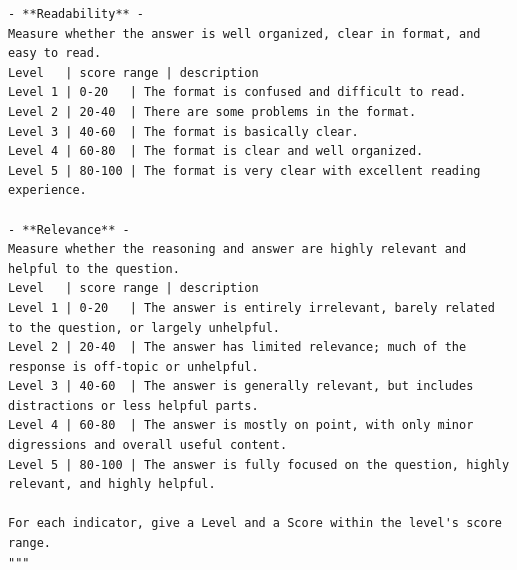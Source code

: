 \documentclass[a4paper,fleqn]{cas-dc}
\begin{document}
\begin{lstlisting}
- **Readability** -
Measure whether the answer is well organized, clear in format, and easy to read.
Level   | score range | description
Level 1 | 0-20   | The format is confused and difficult to read.
Level 2 | 20-40  | There are some problems in the format.
Level 3 | 40-60  | The format is basically clear.
Level 4 | 60-80  | The format is clear and well organized.
Level 5 | 80-100 | The format is very clear with excellent reading experience.

- **Relevance** -
Measure whether the reasoning and answer are highly relevant and helpful to the question.
Level   | score range | description
Level 1 | 0-20   | The answer is entirely irrelevant, barely related to the question, or largely unhelpful.
Level 2 | 20-40  | The answer has limited relevance; much of the response is off-topic or unhelpful.
Level 3 | 40-60  | The answer is generally relevant, but includes distractions or less helpful parts.
Level 4 | 60-80  | The answer is mostly on point, with only minor digressions and overall useful content.
Level 5 | 80-100 | The answer is fully focused on the question, highly relevant, and highly helpful.

For each indicator, give a Level and a Score within the level's score range.
"""
\end{lstlisting}

%





\end{document}
